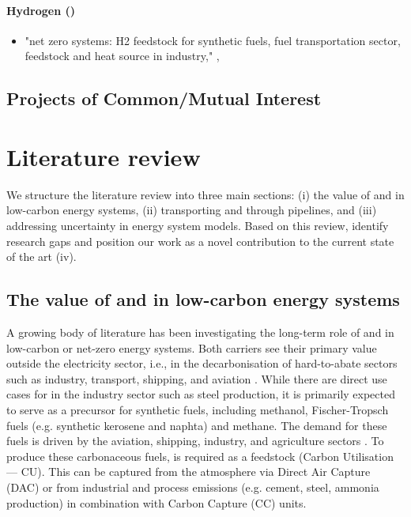 \documentclass[preprint,12pt,sort&compress]{elsarticle}
\begin{document}
\paragraph{Hydrogen ()}
\begin{itemize}
  \item "net zero systems: H2 feedstock for synthetic fuels, fuel transportation sector, feedstock and heat source in industry," \cite{greevenbroekLittleLoseCase2024}, \cite{beresWillHydrogenSynthetic2024}
\end{itemize}

\subsection{Projects of Common/Mutual Interest}


\newpage
\section{Literature review}
\label{sec:literature_review}
We structure the literature review into three main sections: (i) the value of  and  in low-carbon energy systems, (ii) transporting  and  through pipelines, and (iii) addressing uncertainty in energy system models. Based on this review, identify research gaps and position our work as a novel contribution to the current state of the art (iv).

\subsection{The value of  and  in low-carbon energy systems} 
A growing body of literature has been investigating the long-term role of  and  in low-carbon or net-zero energy systems. Both carriers see their primary value outside the electricity sector, i.e., in the decarbonisation of hard-to-abate sectors such as industry, transport, shipping, and aviation \cite{reigstadMovingLowcarbonHydrogen2022}. While there are direct use cases for  in the industry sector such as steel production, it is primarily expected to serve as a precursor for synthetic fuels, including methanol, Fischer-Tropsch fuels (e.g. synthetic kerosene and naphta) and methane. The demand for these fuels is driven by the aviation, shipping, industry, and agriculture sectors \cite{neumannPotentialRoleHydrogen2023}. To produce these carbonaceous fuels,  is required as a feedstock (Carbon Utilisation --- CU). This  can be captured from the atmosphere via Direct Air Capture (DAC) or from industrial and process emissions (e.g. cement, steel, ammonia production) in combination with Carbon Capture (CC) units.
\end{document}
